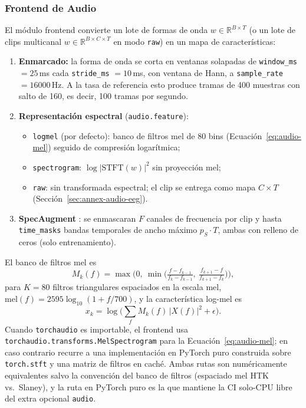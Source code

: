 \subsubsection{Frontend de Audio}

El módulo frontend convierte un lote de formas de onda $w \in \mathbb{R}^{B \times T}$ (o un lote de clips multicanal $w \in \mathbb{R}^{B \times C \times T}$ en modo \texttt{raw}) en un mapa de características:

\begin{enumerate}[leftmargin=*]
    \item \textbf{Enmarcado:} la forma de onda se corta en ventanas solapadas de \texttt{window\_ms} $=25$\,ms cada \texttt{stride\_ms} $=10$\,ms, con ventana de Hann, a \texttt{sample\_rate} $=16000$\,Hz. A la tasa de referencia esto produce tramas de 400 muestras con salto de 160, es decir, 100 tramas por segundo.
    \item \textbf{Representación espectral} (\texttt{audio.feature}):
    \begin{itemize}[leftmargin=*]
        \item \texttt{logmel} (por defecto): banco de filtros mel de $80$ bins (Ecuación~\ref{eq:audio-mel}) seguido de compresión logarítmica;
        \item \texttt{spectrogram}: $\log|\mathrm{STFT}(w)|^2$ sin proyección mel;
        \item \texttt{raw}: sin transformada espectral; el clip se entrega como mapa $C \times T$ (Sección~\ref{sec:annex-audio-eeg}).
    \end{itemize}
    \item \textbf{SpecAugment} \citep{Park2019}: se enmascaran $F$ canales de frecuencia por clip y hasta \texttt{time\_masks} bandas temporales de ancho máximo $p_S \cdot T$, ambas con relleno de ceros (solo entrenamiento).
\end{enumerate}

El banco de filtros mel es
\begin{equation}
M_k(f) = \max\Big(0,\ \min\Big(\tfrac{f-f_{k-1}}{f_k-f_{k-1}},\ \tfrac{f_{k+1}-f}{f_{k+1}-f_k}\Big)\Big),
\label{eq:audio-filterbank}
\end{equation}
para $K = 80$ filtros triangulares espaciados en la escala mel, $\mathrm{mel}(f) = 2595 \log_{10}(1 + f/700)$, y la característica log-mel es
\begin{equation}
x_k = \log\Big(\sum_{f} M_k(f)\,|X(f)|^2 + \epsilon\Big).
\label{eq:audio-mel}
\end{equation}
Cuando \texttt{torchaudio} es importable, el frontend usa \texttt{torchaudio.transforms.MelSpectrogram} para la Ecuación~\ref{eq:audio-mel}; en caso contrario recurre a una implementación en PyTorch puro construida sobre \texttt{torch.stft} y una matriz de filtros en caché. Ambas rutas son numéricamente equivalentes salvo la convención del banco de filtros (espaciado mel HTK vs.\ Slaney), y la ruta en PyTorch puro es la que mantiene la CI solo-CPU libre del extra opcional \texttt{audio}.

